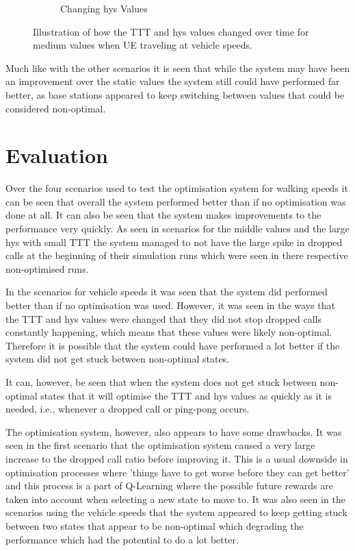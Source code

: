\begin{figure}[H]
\begin{subfigure}[b]{0.49\textwidth}
                \caption{Changing hys Values}
                \label{fig:veh_highhys_hys}
        \end{subfigure}
        \caption{Illustration of how the TTT and hys values changed over time for medium values when UE traveling at vehicle speeds.}\label{fig:veh_highhys_ttthys}
\end{figure}
Much like with the other scenarios it is seen that while the system may have been an improvement over the static values the system still could have performed far better, as base stations appeared to keep switching between values that could be considered non-optimal.
\section{Evaluation}
Over the four scenarios used to test the optimisation system for walking speeds it can be seen that overall the system performed better than if no optimisation was done at all. It can also be seen that the system makes improvements to the performance very quickly. As seen in scenarios for the middle values and the large hys with small TTT the system managed to not have the large spike in dropped calls at the beginning of their simulation runs which were seen in there respective non-optimised runs.

In the scenarios for vehicle speeds it was seen that the system did performed better than if no optimisation was used. However, it was seen in the ways that the TTT and hys values were changed that they did not stop dropped calls constantly happening, which means that these values were likely non-optimal. Therefore it is possible that the system could have performed a lot better if the system did not get stuck between non-optimal states.

It can, however, be seen that when the system does not get stuck between non-optimal states that it will optimise the TTT and hys values as quickly as it is needed, i.e., whenever a dropped call or ping-pong occurs.

The optimisation system, however, also appears to have some drawbacks. It was seen in the first scenario that the optimisation system caused a very large increase to the dropped call ratio before improving it. This is a usual downside in optimisation processes where 'things have to get worse before they can get better' and this process is a part of Q-Learning where the possible future rewards are taken into account when selecting a new state to move to. It was also seen in the scenarios using the vehicle speeds that the system appeared to keep getting stuck between two states that appear to be non-optimal which degrading the performance which had the potential to do a lot better.